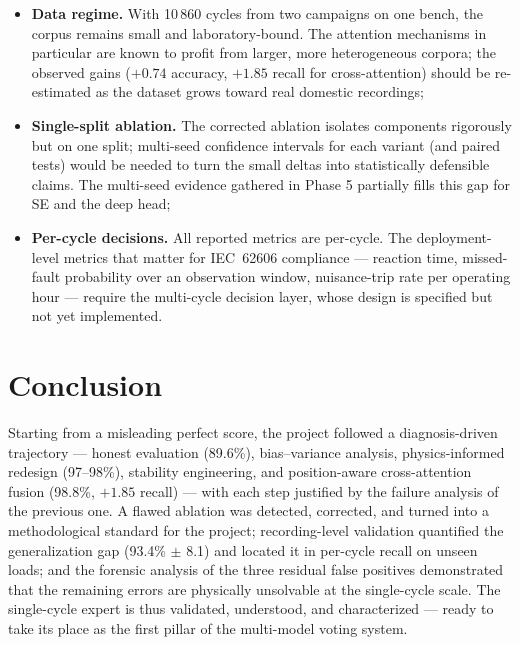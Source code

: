 \begin{itemize}[itemsep=2pt]
    \item \textbf{Data regime.} With 10\,860 cycles from two campaigns on one bench, the corpus remains small and laboratory-bound. The attention mechanisms in particular are known to profit from larger, more heterogeneous corpora; the observed gains ($+0.74$ accuracy, $+1.85$ recall for cross-attention) should be re-estimated as the dataset grows toward real domestic recordings;
    \item \textbf{Single-split ablation.} The corrected ablation isolates components rigorously but on one split; multi-seed confidence intervals for each variant (and paired tests) would be needed to turn the small deltas into statistically defensible claims. The multi-seed evidence gathered in Phase 5 partially fills this gap for SE and the deep head;
    \item \textbf{Per-cycle decisions.} All reported metrics are per-cycle. The deployment-level metrics that matter for IEC~62606 compliance --- reaction time, missed-fault probability over an observation window, nuisance-trip rate per operating hour --- require the multi-cycle decision layer, whose design is specified but not yet implemented.
\end{itemize}

\section*{Conclusion}

Starting from a misleading perfect score, the project followed a diagnosis-driven trajectory --- honest evaluation (89.6\%), bias--variance analysis, physics-informed redesign (97--98\%), stability engineering, and position-aware cross-attention fusion (98.8\%, $+1.85$ recall) --- with each step justified by the failure analysis of the previous one. A flawed ablation was detected, corrected, and turned into a methodological standard for the project; recording-level validation quantified the generalization gap (93.4\% $\pm$ 8.1) and located it in per-cycle recall on unseen loads; and the forensic analysis of the three residual false positives demonstrated that the remaining errors are physically unsolvable at the single-cycle scale. The single-cycle expert is thus validated, understood, and characterized --- ready to take its place as the first pillar of the multi-model voting system.
